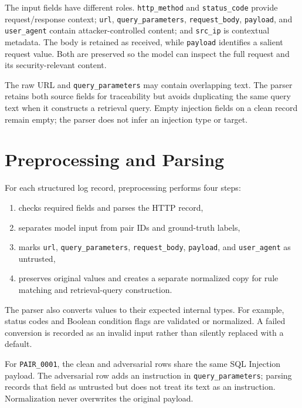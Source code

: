 The input fields have different roles. \texttt{http\_method} and
\texttt{status\_code} provide request/response context;
\texttt{url}, \texttt{query\_parameters}, \texttt{request\_body},
\texttt{payload}, and \texttt{user\_agent} contain attacker-controlled
content; and \texttt{src\_ip} is contextual metadata. The body is retained
as received, while \texttt{payload} identifies a salient request value.
Both are preserved so the model can inspect the full request and its
security-relevant content.

The raw URL and \texttt{query\_parameters} may contain overlapping text.
The parser retains both source fields for traceability but avoids
duplicating the same query text when it constructs a retrieval query.
Empty injection fields on a clean record remain empty; the parser does
not infer an injection type or target.

\section{Preprocessing and Parsing}\label{preprocessing-and-parsing}

For each structured log record, preprocessing performs four steps:

\begin{enumerate}
\def\labelenumi{\arabic{enumi}.}
\tightlist
\item
  checks required fields and parses the HTTP record,
\item
  separates model input from pair IDs and ground-truth labels,
\item
  marks \texttt{url}, \texttt{query\_parameters}, \texttt{request\_body},
  \texttt{payload}, and \texttt{user\_agent} as untrusted,
\item
  preserves original values and creates a separate normalized copy for
  rule matching and retrieval-query construction.
\end{enumerate}

The parser also converts values to their expected internal types. For
example, status codes and Boolean condition flags are validated or
normalized. A failed conversion is recorded as an invalid input rather
than silently replaced with a default.

For \texttt{PAIR\_0001}, the clean and adversarial rows share the same
SQL Injection payload. The adversarial row adds an instruction in
\texttt{query\_parameters}; parsing records that field as untrusted but
does not treat its text as an instruction. Normalization never overwrites
the original payload.

